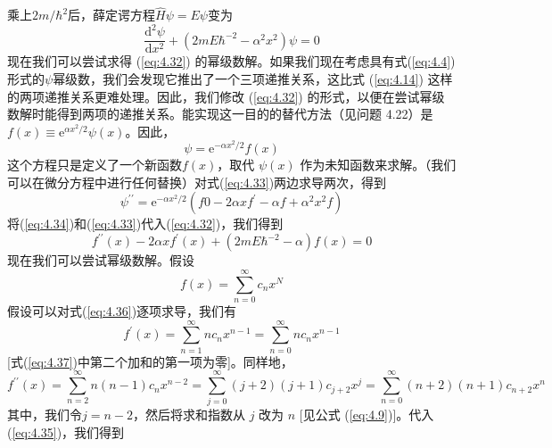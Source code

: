     乘上$2m/\hbar^2$后，薛定谔方程$\hat{H}\psi = E\psi$变为
    \begin{equation}
        \frac{\mathrm{d}^2\psi}{\mathrm{d}x^2} + \left(2mE\hbar^{-2}-\alpha^2x^2\right)\psi = 0
        \label{eq:4.32}
    \end{equation}
    现在我们可以尝试求得 (\ref{eq:4.32}) 的幂级数解。如果我们现在考虑具有式(\ref{eq:4.4})形式的$\psi$幂级数，我们会发现它推出了一个三项递推关系，这比式 (\ref{eq:4.14}) 这样的两项递推关系更难处理。因此，我们修改 (\ref{eq:4.32}) 的形式，以便在尝试幂级数解时能得到两项的递推关系。能实现这一目的的替代方法（见问题 4.22）是$f\left(x\right) \equiv \mathrm{e}^{\alpha x^2/2}\psi\left(x\right)$。因此，
    \begin{equation}
        \psi = \mathrm{e}^{-\alpha x^2/2}f\left(x\right)
        \label{eq:4.33}
    \end{equation}
    这个方程只是定义了一个新函数$f\left(x\right)$，取代 $\psi\left(x\right)$ 作为未知函数来求解。（我们可以在微分方程中进行任何替换）对式(\ref{eq:4.33})两边求导两次，得到
    \begin{equation}
        \psi^{\prime\prime} = \mathrm{e}^{-\alpha x^2/2}\left(f0-2\alpha xf^{\prime} - \alpha f + \alpha^2x^2f\right)
        \label{eq:4.34}
    \end{equation}
    将(\ref{eq:4.34})和(\ref{eq:4.33})代入(\ref{eq:4.32})，我们得到
    \begin{equation}
        f^{\prime\prime}\left(x\right) - 2\alpha x f^{\prime}\left(x\right) + \left(2mE\hbar^{-2} - \alpha\right)f\left(x\right) = 0
        \label{eq:4.35}
    \end{equation}
    现在我们可以尝试幂级数解。假设
    \begin{equation}
        f\left(x\right) = \sum_{n=0}^{\infty}c_nx^N
        \label{eq:4.36}
    \end{equation}
    假设可以对式(\ref{eq:4.36})逐项求导，我们有
    \begin{equation}
        f^{\prime}\left(x\right) = \sum_{n=1}^{\infty}nc_nx^{n-1} = \sum_{n=0}^{\infty}nc_nx^{n-1}
        \label{eq:4.37}
    \end{equation}
    [式(\ref{eq:4.37})中第二个加和的第一项为零]。同样地，
    \begin{equation*}
        f^{\prime\prime}\left(x\right) = \sum_{n=2}^{\infty}n(n-1)c_nx^{n-2} = \sum_{j=0}^{\infty}(j+2)(j+1)c_{j+2}x^{j} = \sum_{n=0}^{\infty}(n+2)(n+1)c_{n+2}x^{n}
    \end{equation*}
    其中，我们令$j = n - 2$，然后将求和指数从 $j$ 改为 $n$ [见公式 (\ref{eq:4.9})]。代入 (\ref{eq:4.35})，我们得到

